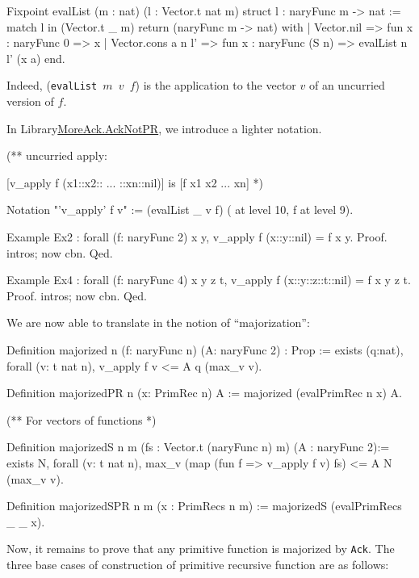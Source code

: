 \begin{Coqsrc}
Fixpoint evalList (m : nat) (l : Vector.t nat m) {struct l} :
 naryFunc m -> nat :=
  match l in (Vector.t _ m) return (naryFunc m -> nat) with
  | Vector.nil => fun x : naryFunc 0 => x
  | Vector.cons a n l' => fun x : naryFunc (S n) => evalList n l' (x a)
  end.
\end{Coqsrc}

Indeed, (\texttt{evalList $m$ $v$ $f$}) is the application to the vector $v$ of
an uncurried version of $f$.

In Library\href{../theories/html/hydras.MoreAck.AckNotPR.html}{MoreAck.AckNotPR}, we introduce a lighter notation.

\begin{Coqsrc}
(**  uncurried apply:
 
[v_apply f (x1::x2:: ... ::xn::nil)]  is [f x1 x2 ... xn] 
 *)

Notation "'v_apply' f v" := (evalList _ v f) ( at level 10, f at level 9).

Example Ex2 : forall (f: naryFunc 2) x y,
    v_apply f (x::y::nil) = f x y.
Proof.   intros; now cbn. Qed.

Example Ex4 : forall (f: naryFunc 4) x y z t,
    v_apply f (x::y::z::t::nil) = f x y z t.
Proof.  intros; now cbn. Qed.
\end{Coqsrc}

We are now able to translate in \gallina{} the notion of ``majorization'':

\begin{Coqsrc}
Definition majorized {n} (f: naryFunc n) (A: naryFunc 2) : Prop :=
  exists (q:nat), forall (v: t nat n),
      v_apply f v <= A q  (max_v v).

Definition majorizedPR {n} (x: PrimRec n) A := 
           majorized (evalPrimRec n x) A.

(** For vectors of functions *)

Definition majorizedS {n m} (fs : Vector.t (naryFunc n) m)
           (A : naryFunc 2):=
  exists N, forall (v: t nat n),
      max_v (map (fun f => v_apply f v) fs) <= A N (max_v v).

Definition majorizedSPR {n m} (x : PrimRecs n m) :=
  majorizedS (evalPrimRecs _ _ x).
\end{Coqsrc}

Now, it remains to prove that any primitive function is majorized by \texttt{Ack}.
The three base cases of construction of primitive recursive function are as follows:

